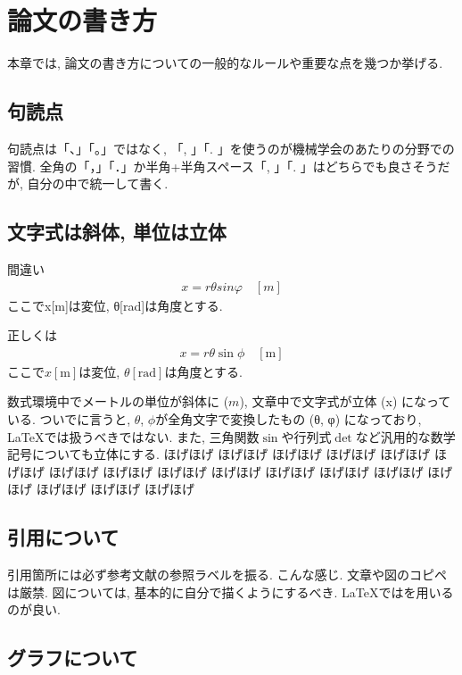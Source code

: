 \chapter{論文の書き方}
本章では, 論文の書き方についての一般的なルールや重要な点を幾つか挙げる. 

\section{句読点}
句読点は「、」「。」ではなく, 「, 」「. 」を使うのが機械学会のあたりの分野での習慣. 全角の「，」「．」か半角+半角スペース「, 」「. 」はどちらでも良さそうだが, 自分の中で統一して書く. 


\section{文字式は斜体, 単位は立体}
\begin{itembox}[c]{間違い}
  \begin{align}
    x = rθ sinφ \quad [m]
  \end{align}
ここでx[m]は変位, θ[rad]は角度とする. 
\end{itembox}
\addtocounter{equation}{-1}
\begin{itembox}[c]{正しくは}
  \begin{align}
    x = r\theta \sin\phi \quad [\mathrm{m}]
  \end{align}
ここで$x[\mathrm{m}]$は変位, $\theta[\mathrm{rad}]$は角度とする. 

\end{itembox}
数式環境中でメートルの単位が斜体に ($m$),  文章中で文字式が立体 (x) になっている. ついでに言うと, $\theta$, $\phi$が全角文字で変換したもの (θ, φ) になっており, \LaTeX では扱うべきではない. また, 三角関数$\sin$や行列式$\det$など汎用的な数学記号についても立体にする. 
ほげほげ
ほげほげ
ほげほげ
ほげほげ
ほげほげ
ほげほげ
ほげほげ
ほげほげ
ほげほげ
ほげほげ
ほげほげ
ほげほげ
ほげほげ
ほげほげ
ほげほげ
ほげほげ
ほげほげ

\section{引用について}
引用箇所には必ず参考文献の参照ラベルを振る\cite{knuth1986texbook}. こんな感じ. 文章や図のコピペは厳禁. 図については, 基本的に自分で描くようにするべき. \LaTeX では\BibTeX を用いるのが良い. 


\section{グラフについて}
